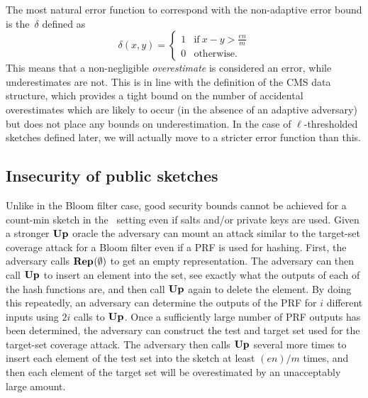 %
%
The most natural error function to correspond with the non-adaptive error bound
is the~$\delta$ defined as
\begin{equation}
  \delta(x, y) =
  \begin{cases}
    1 & \text{if}\ x - y > \frac{en}{m} \\
    0 & \text{otherwise.}
  \end{cases}
\end{equation}
%
%
This means that a non-negligible \emph{overestimate} is considered an error,
while underestimates are not. This is in line with the definition of the CMS
data structure, which provides a tight bound on the number of accidental
overestimates which are likely to occur (in the absence of an adaptive
adversary) but does not place any bounds on underestimation. In the case of
$\ell$-thresholded sketches defined later, we will actually move to a stricter
error function than this.

\subsection{Insecurity of public sketches}

Unlike in the Bloom filter case, good security bounds cannot be achieved for a
count-min sketch in the \errep\ setting even if salts and/or private keys are
used. Given a stronger $\textup{\textbf{Up}}\hspace{0.5pt}$ oracle  the adversary can mount
an attack similar to the target-set coverage attack for a Bloom filter even if a
PRF is used for
hashing. First, the adversary calls $\textup{\textbf{Rep}}\hspace{0.5pt}(\emptyset)$ to get an empty
representation. The adversary can then call $\textup{\textbf{Up}}\hspace{0.5pt}$ to insert an element into the
set, see exactly what the outputs of each of the hash functions are, and then
call $\textup{\textbf{Up}}\hspace{0.5pt}$ again to delete the element. By doing this repeatedly, an adversary
can determine the outputs of the PRF for $i$ different inputs using $2i$ calls
to $\textup{\textbf{Up}}\hspace{0.5pt}$. Once a sufficiently large number of PRF outputs has been determined,
the adversary can construct the test and target set used for the target-set
coverage attack. The adversary then calls $\textup{\textbf{Up}}\hspace{0.5pt}$ several more times to insert
each element of the test set into the sketch at least $(en)/m$ times, and then
each element of the target set will be overestimated by an unacceptably large
amount.

